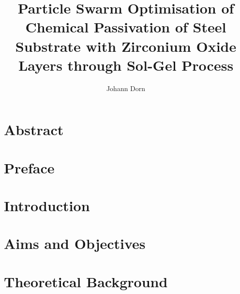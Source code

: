 \documentclass[a4paper]{article}
\title{Particle Swarm Optimisation of Chemical Passivation of Steel Substrate with Zirconium Oxide Layers through Sol-Gel Process}
\author{Johann Dorn}
\begin{document}
\maketitle


\clearpage
\section*{Abstract}


\section*{Preface}
%

\tableofcontents
\clearpage
\printglossaries
\clearpage

\section{Introduction}                                


\section{Aims and Objectives}


\section{Theoretical Background}
%



\end{document}
